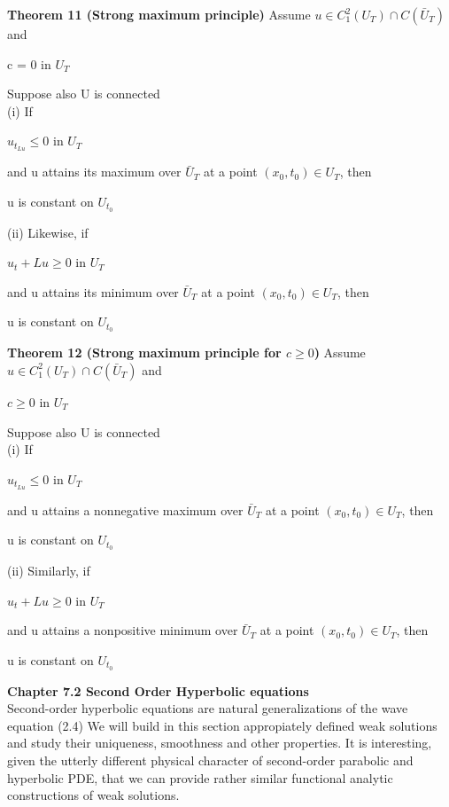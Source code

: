 \documentclass{article}
\newcommand\tab[1][1cm]{\hspace*{#1}}
\begin{document}
\textbf {Theorem 11 (Strong maximum principle)} Assume $u \in C_1^2(U_T) \cap C(\bar{U}_T)$ and
\begin{center}
c = 0 \tab in $U_T$
\end{center}
Suppose also U is connected \\
\tab (i) If
\begin{center}
$u_{t _ {Lu}} \leq 0$ \tab in $U_T$
\end{center}
and u attains its maximum over $\bar{U}_T$ at a point $(x_0, t_0) \in U_T$, then 
\begin{center}
u is constant on $U_{t_{0}}$
\end{center}
\tab (ii) Likewise, if
\begin{center}
$u_t + Lu \geq 0$ \tab in $U_T$
\end{center}
and u attains its minimum over $\bar{U}_T$ at a point $(x_0, t_0) \in U_T$, then 
\begin{center}
u is constant on $U_{t_{0}}$
\end{center}

\textbf {Theorem 12 (Strong maximum principle for $c \geq 0$)} Assume $u \in C_1^2(U_T) \cap C(\bar{U}_T)$ and
\begin{center}
$c \geq 0$ \tab in $U_T$
\end{center}
Suppose also U is connected \\
\tab (i) If
\begin{center}
$u_{t_{Lu}} \leq 0$ \tab in $U_T$
\end{center}
and u attains a nonnegative maximum over $\bar{U}_T$ at a point $(x_0, t_0) \in U_T$, then
\begin{center}
u is constant on $U_{t_{0}}$
\end{center}
\tab (ii) Similarly, if
\begin{center}
$u_t + Lu \geq 0$ \tab in $U_T$
\end{center}
and u attains a nonpositive minimum over $\bar{U}_T$ at a point $(x_0, t_0) \in U_T$, then
\begin{center}
u is constant on $U_{t_{0}}$
\end{center}

\textbf {Chapter 7.2 Second Order Hyperbolic equations} \\ Second-order hyperbolic equations are natural generalizations of the wave equation (2.4) We will build in this section appropiately defined weak solutions and study their uniqueness, smoothness and other properties. It is interesting, given the utterly different physical character of second-order parabolic and hyperbolic PDE, that we can provide rather similar functional analytic constructions of weak solutions.
\end{document}
